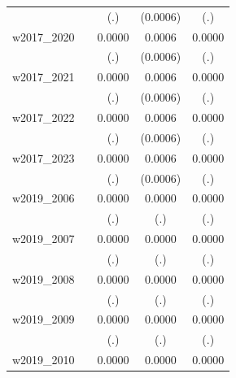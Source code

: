 \begin{table}[htbp]
\begin{tabular}{l*{4}{c}}
            &                     &         (.)         &    (0.0006)         &         (.)         \\
[1em]
w2017\_2020  &                     &      0.0000         &      0.0006         &      0.0000         \\
            &                     &         (.)         &    (0.0006)         &         (.)         \\
[1em]
w2017\_2021  &                     &      0.0000         &      0.0006         &      0.0000         \\
            &                     &         (.)         &    (0.0006)         &         (.)         \\
[1em]
w2017\_2022  &                     &      0.0000         &      0.0006         &      0.0000         \\
            &                     &         (.)         &    (0.0006)         &         (.)         \\
[1em]
w2017\_2023  &                     &      0.0000         &      0.0006         &      0.0000         \\
            &                     &         (.)         &    (0.0006)         &         (.)         \\
[1em]
w2019\_2006  &                     &      0.0000         &      0.0000         &      0.0000         \\
            &                     &         (.)         &         (.)         &         (.)         \\
[1em]
w2019\_2007  &                     &      0.0000         &      0.0000         &      0.0000         \\
            &                     &         (.)         &         (.)         &         (.)         \\
[1em]
w2019\_2008  &                     &      0.0000         &      0.0000         &      0.0000         \\
            &                     &         (.)         &         (.)         &         (.)         \\
[1em]
w2019\_2009  &                     &      0.0000         &      0.0000         &      0.0000         \\
            &                     &         (.)         &         (.)         &         (.)         \\
[1em]
w2019\_2010  &                     &      0.0000         &      0.0000         &      0.0000         \\

\end{tabular}
\end{table}
